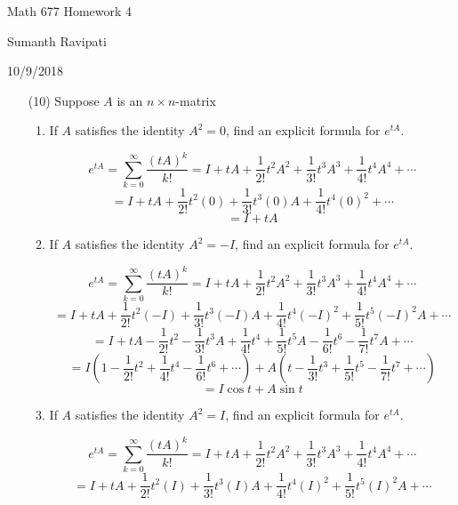 \documentclass[12pt,letterpaper,reqno]{amsart}
\begin{document}
\thispagestyle{empty}
\centerline{\Large Math 677 Homework 4}
\centerline{Sumanth Ravipati}
\centerline{10/9/2018}
\vspace{.25in}

\begin{enumerate}
\item[(10)] Suppose $A$ is an $n \times n$-matrix
\begin{enumerate}
    \item If $A$ satisfies the identity $A^2 = 0$, find an explicit formula for $e^{tA}$.
    \begin{flushleft}
    $$e ^ { tA } = \sum _ { k = 0 } ^ { \infty } \frac { (tA) ^ { k } } { k ! } = I + tA + \frac { 1 } { 2 ! } t^2 A ^ { 2 } + \frac { 1 } { 3 ! } t^3 A ^ { 3 } + \frac { 1 } { 4 ! } t^4 A ^ { 4 } + \cdots$$
    $$= I + tA + \frac { 1 } { 2 ! } t^2(0) + \frac { 1 } { 3 ! } t^3(0)A + \frac { 1 } { 4 ! } t^4(0)^2 + \cdots$$
    $$= I + tA $$
    \newline
    \end{flushleft}
    \item If $A$ satisfies the identity $A^2 = -I$, find an explicit formula for $e^{tA}$.
    \begin{flushleft}
    $$e ^ { tA } = \sum _ { k = 0 } ^ { \infty } \frac { (tA) ^ { k } } { k ! } = I + tA + \frac { 1 } { 2 ! } t^2 A ^ { 2 } + \frac { 1 } { 3 ! } t^3 A ^ { 3 } + \frac { 1 } { 4 ! } t^4 A ^ { 4 } + \cdots$$
    $$= I + tA + \frac { 1 } { 2 ! } t^2 (-I) + \frac { 1 } { 3 ! } t^3(-I)A + \frac { 1 } { 4 ! } t^4 (-I)^2 + \frac { 1 } { 5 ! } t^5(-I)^2A + \cdots$$
    $$= I + tA - \frac { 1 } { 2 ! } t^2 - \frac { 1 } { 3 ! } t^3A + \frac { 1 } { 4 ! } t^4 + \frac { 1 } { 5 ! } t^5A - \frac { 1 } { 6 ! } t^6 - \frac { 1 } { 7 ! } t^7A + \cdots$$
    $$= I(1 - \frac { 1 } { 2 ! } t^2 + \frac { 1 } { 4 ! } t^4 - \frac { 1 } { 6 ! } t^6 + \cdots) + A(t - \frac { 1 } { 3 ! } t^3 + \frac { 1 } { 5 ! } t^5 - \frac { 1 } { 7 ! } t^7 + \cdots)$$
    $$= I\cos{t} + A\sin{t}$$
    \newline
    \end{flushleft}
    \item If $A$ satisfies the identity $A^2 = I$, find an explicit formula for $e^{tA}$.
    \begin{flushleft}
    $$e ^ { tA } = \sum _ { k = 0 } ^ { \infty } \frac { (tA) ^ { k } } { k ! } = I + tA + \frac { 1 } { 2 ! } t^2 A ^ { 2 } + \frac { 1 } { 3 ! } t^3 A ^ { 3 } + \frac { 1 } { 4 ! } t^4 A ^ { 4 } + \cdots$$
    $$= I + tA + \frac { 1 } { 2 ! } t^2 (I) + \frac { 1 } { 3 ! } t^3(I)A + \frac { 1 } { 4 ! } t^4 (I)^2 + \frac { 1 } { 5 ! } t^5(I)^2A + \cdots$$

\end{flushleft}
\end{enumerate}
\end{enumerate}
\end{document}
